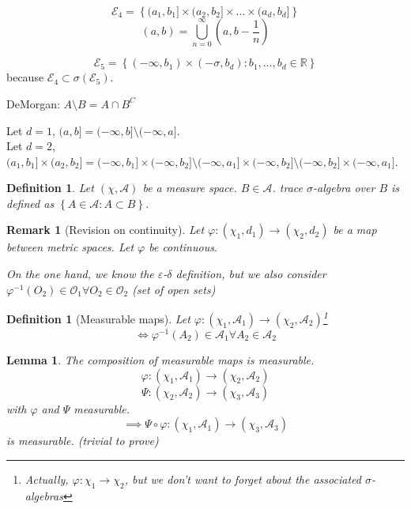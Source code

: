 \documentclass[a4paper]{article}
\newcounter{lecref}[section]
\numberwithin{lecref}{section}
\theoremstyle{break}
\newtheorem{definition}[lecref]{Definition}
\newtheorem{lemma}[lecref]{Lemma}
\newtheorem*{Remark}{Remark}
\newcommand{\Set}[1]{\left\{#1\right\}}
\begin{document}
\[ \mathcal E_4 = \Set{(a_1, b_1] \times (a_2, b_2] \times \dots \times (a_d, b_d]} \]
\[ (a, b) = \bigcup_{n=0}^\infty (a, b - \frac1n) \]

\[ \mathcal E_5 = \Set{(-\infty, b_1) \times (-\sigma, b_d): b_1, \dots, b_d \in \mathbb R} \]
because $\mathcal E_4 \subset \sigma(\mathcal E_5)$.

DeMorgan: $A \setminus B = A \cap B^C$

Let $d = 1$, $(a, b] = (-\infty, b] \setminus (-\infty, a]$. \\
Let $d = 2$, $(a_1, b_1] \times (a_2, b_2] = (-\infty, b_1] \times (-\infty, b_2] \setminus (-\infty, a_1] \times (-\infty, b_2] \setminus (-\infty, b_2] \times (-\infty, a_1]$.

\begin{definition}
  Let $(\chi, \mathcal A)$ be a measure space. $B \in \mathcal A$.
  trace $\sigma$-algebra over $B$ is defined as $\Set{A \in \mathcal A: A \subset B}$.
\end{definition}

\begin{Remark}[Revision on continuity]
  Let $\varphi: (\chi_1, d_1) \to (\chi_2, d_2)$ be a map between metric spaces.
  Let $\varphi$ be continuous.

  On the one hand, we know the $\varepsilon$-$\delta$ definition,
  but we also consider $\varphi^{-1}(O_2) \in \mathcal O_1 \forall O_2 \in \mathcal O_2$ (set of open sets)
\end{Remark}

\begin{definition}[Measurable maps]
  Let $\varphi: (\chi_1, \mathcal A_1) \to (\chi_2, \mathcal A_2)$\footnote{Actually, $\varphi: \chi_1 \to \chi_2$, but we don't want to forget about the associated $\sigma$-algebras}
  \[ \iff \varphi^{-1}(A_2) \in \mathcal A_1 \forall A_2 \in \mathcal A_2 \]
\end{definition}

\begin{lemma}
  \label{lem1}
  The composition of measurable maps is measurable.
  \[ \varphi: (\chi_1, \mathcal A_1) \to (\chi_2, \mathcal A_2) \]
  \[ \Psi: (\chi_2, \mathcal A_2) \to (\chi_3, \mathcal A_3) \]
  with $\varphi$ and $\Psi$ measurable.
  \[ \implies \Psi \circ \varphi: (\chi_1, \mathcal A_1) \to (\chi_3, \mathcal A_3) \]
  is measurable. (trivial to prove)
\end{lemma}
\end{document}
